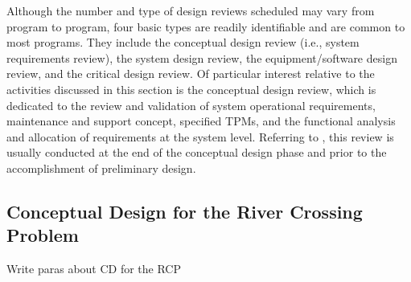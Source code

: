 Although the number and type of design reviews scheduled may vary from program to program, four basic types are readily identifiable and are common to most programs. They include the conceptual design review (i.e., system requirements review), the system design review, the equipment/software design review, and the critical design review. Of particular interest relative to the activities discussed in this section is the conceptual design review, which is dedicated to the review and validation of system operational requirements, maintenance and support concept, specified TPMs, and the functional analysis and allocation of requirements at the system level. Referring to , this review is usually conducted at the end of the conceptual design phase and prior to the accomplishment of preliminary design.

\subsection{Conceptual Design for the River Crossing Problem}

Write paras about CD for the RCP

